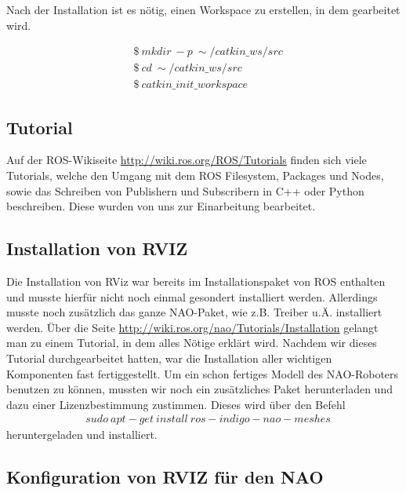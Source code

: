 \documentclass{scrartcl}
\begin{document}
Nach der Installation ist es nötig, einen Workspace zu erstellen, in dem gearbeitet wird.

\begin{align}
&\$\ mkdir\ -p\ \sim/catkin\_ws/src\\
&\$\ cd\ \sim/catkin\_ws/src\\
&\$\ catkin\_init\_workspace
\end{align}

\subsection{Tutorial}

Auf der ROS-Wikiseite
\url{http://wiki.ros.org/ROS/Tutorials} finden sich viele Tutorials, welche den Umgang mit dem ROS Filesystem, Packages und Nodes, sowie das Schreiben von Publishern und Subscribern in C++ oder Python beschreiben.
Diese wurden von uns zur Einarbeitung bearbeitet.

\subsection{Installation von RVIZ}

Die Installation von RViz war bereits im Installationspaket von ROS enthalten und musste hierfür nicht noch einmal gesondert installiert werden. Allerdings musste noch zusätzlich das ganze NAO-Paket, wie z.B. Treiber u.Ä. installiert werden. Über die Seite 
\url{http://wiki.ros.org/nao/Tutorials/Installation}  gelangt man zu einem Tutorial, in dem alles Nötige erklärt wird. Nachdem wir dieses Tutorial durchgearbeitet hatten, war die Installation aller wichtigen Komponenten fast fertiggestellt. Um ein schon fertiges Modell des NAO-Roboters benutzen zu können, mussten wir noch ein zusätzliches Paket herunterladen und dazu einer Lizenzbestimmung zustimmen. Dieses wird über den Befehl
\begin{align}
&sudo\ apt-get\ install\ ros-indigo-nao-meshes
\end{align}
heruntergeladen und installiert.

\subsection{Konfiguration von RVIZ für den NAO}
\end{document}

